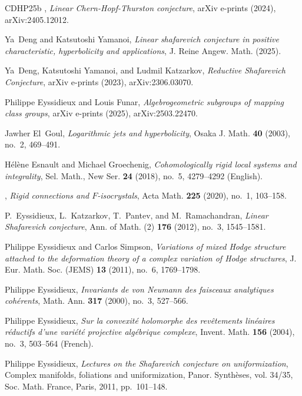 \documentclass[english]{amsproc}
\theoremstyle{plain}
\theoremstyle{definition}
\theoremstyle{remark}
\theoremstyle{plain}
\numberwithin{equation}{thm} %
\begin{document}
\begin{thebibliography}{CDHP25b}
		\bysame, \emph{{Linear Chern-Hopf-Thurston conjecture}}, arXiv e-prints (2024),
		arXiv:2405.12012.
		
		Ya~{Deng} and Katsutoshi {Yamanoi}, \emph{Linear shafarevich conjecture in
			positive characteristic, hyperbolicity and applications}, J. Reine Angew.
		Math. (2025).
		
		Ya~{Deng}, Katsutoshi {Yamanoi}, and Ludmil {Katzarkov}, \emph{{Reductive
				Shafarevich Conjecture}}, arXiv e-prints (2023), arXiv:2306.03070.
		
		Philippe {Eyssidieux} and Louis {Funar}, \emph{{Algebrogeometric subgroups of
				mapping class groups}}, arXiv e-prints (2025), arXiv:2503.22470.
		
		Jawher El~Goul, \emph{Logarithmic jets and hyperbolicity}, Osaka J. Math.
		\textbf{40} (2003), no.~2, 469--491. 
		
		H{\'e}l{\`e}ne Esnault and Michael Groechenig, \emph{Cohomologically rigid
			local systems and integrality}, Sel. Math., New Ser. \textbf{24} (2018),
		no.~5, 4279--4292 (English).
		
		\bysame, \emph{Rigid connections and
			{$F$}-isocrystals}, Acta Math. \textbf{225} (2020), no.~1, 103--158.
		
		P.~Eyssidieux, L.~Katzarkov, T.~Pantev, and M.~Ramachandran, \emph{Linear
			{S}hafarevich conjecture}, Ann. of Math. (2) \textbf{176} (2012), no.~3,
		1545--1581. 
		
		Philippe Eyssidieux and Carlos Simpson, \emph{Variations of mixed {H}odge
			structure attached to the deformation theory of a complex variation of
			{H}odge structures}, J. Eur. Math. Soc. (JEMS) \textbf{13} (2011), no.~6,
		1769--1798. 
		
		Philippe Eyssidieux, \emph{Invariants de von {N}eumann des faisceaux
			analytiques coh\'erents}, Math. Ann. \textbf{317} (2000), no.~3, 527--566.
		
		Philippe {Eyssidieux}, \emph{{Sur la convexit\'e holomorphe des rev\^etements
				lin\'eaires r\'eductifs d'une vari\'et\'e projective alg\'ebrique complexe}},
		{Invent. Math.} \textbf{156} (2004), no.~3, 503--564 (French).
		
		Philippe Eyssidieux, \emph{Lectures on the {S}hafarevich conjecture on
			uniformization}, Complex manifolds, foliations and uniformization, Panor.
		Synth\`eses, vol. 34/35, Soc. Math. France, Paris, 2011, pp.~101--148.
		

\end{thebibliography}
\end{document}
